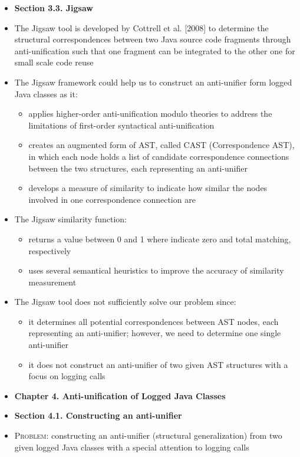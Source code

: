 \documentclass{article}
\newcommand{\bold}{\textbf}
\newcommand{\tsc}{\textsc}
\begin{document}
\begin{itemize} [leftmargin=.1in]
\item \bold{Section 3.3. Jigsaw}
\item The Jigsaw tool is developed by Cottrell et al. [2008] to determine the structural correspondences between two Java source code fragments through anti-unification such that one fragment can be integrated to the other one for small scale code reuse
\item The Jigsaw framework could help us to construct an anti-unifier form logged Java classes as it:
\begin{itemize}
\item applies higher-order anti-unification modulo theories to address the limitations of first-order syntactical anti-unification
\item creates an augmented form of AST, called CAST (Correspondence AST), in which each node holds a list of candidate correspondence connections between the two structures, each representing an anti-unifier
\item develops a measure of similarity to indicate how similar the nodes involved in one correspondence connection are

\end{itemize}
\item The Jigsaw similarity function:
\begin{itemize}
\item returns a value between 0 and 1 where indicate zero and total matching, respectively
\item uses several semantical heuristics to improve the accuracy of similarity measurement
\end{itemize}
\item The Jigsaw tool does not sufficiently solve our problem since:
\begin{itemize}
\item it determines all potential correspondences between AST nodes, each representing an anti-unifier; however, we need to determine one single anti-unifier%
\item it does not construct an anti-unifier of two given AST structures with a focus on logging calls%
\end{itemize}

\item \bold{Chapter 4. Anti-unification of Logged Java Classes}
\item \bold{Section 4.1. Constructing an anti-unifier}
\item \tsc{Problem: }constructing an anti-unifier (structural generalization) from two given logged Java classes with a special  attention to logging calls


\end{itemize}
\end{document}
